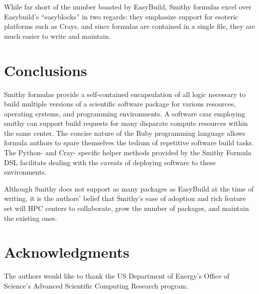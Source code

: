 \documentclass{acm_proc_article-sp}
\begin{document}
While far short of the number boasted by EasyBuild, Smithy formulas excel over
Easybuild's ``easyblocks'' in two regards: they emphasize support for esoteric
platforms such as Crays, and since formulas are contained in a single file, they
are much easier to write and maintain.

\section{Conclusions}

Smithy formulas provide a self-contained encapsulation of all logic necessary to
build multiple versions of a scientific software package for various resources,
operating systems, and programming environments. A software czar employing
smithy can support build requests for many disparate compute resources within
the same center. The concise nature of the Ruby programming language allows
formula authors to spare themselves the tedium of repetitive software build
tasks. The Python- and Cray- specific helper methods provided by the Smithy
Formula DSL facilitate dealing with the caveats of deploying software to these
environments.

Although Smithy does not support as many packages as EasyBuild at the time of
writing, it is the authors' belief that Smithy's ease of adoption and rich
feature set will HPC centers to collaborate, grow the number of packages, and
maintain the existing ones.

\section{Acknowledgments}

The authors would like to thank the US Department of Energy's Office of
Science's Advanced Scientific Computing Research program.







\end{document}
